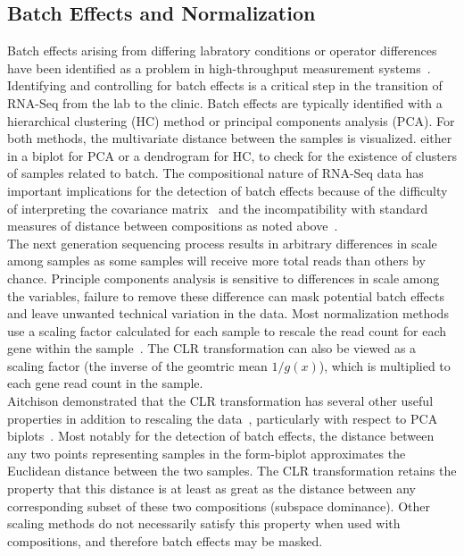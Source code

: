 \documentclass{article}\usepackage[]{graphicx}\usepackage[]{color}
\theoremstyle{definition}
\begin{document}
\subsection{Batch Effects and Normalization}
Batch effects arising from differing labratory conditions or operator differences have been identified as a problem in high-throughput measurement systems~\cite{leek2010, chen2011}.  Identifying and controlling for batch effects is a critical step in the transition of RNA-Seq from the lab to the clinic.  Batch effects are typically identified with a hierarchical clustering (HC) method or principal components analysis (PCA).  For both methods, the multivariate distance between the samples is visualized. either in a biplot for PCA or a dendrogram for HC, to check for the existence of clusters of samples related to batch. %
The compositional nature of RNA-Seq data has important implications for the detection of batch effects because of the difficulty of interpreting the covariance matrix~\cite{Aitchison1986} and the incompatibility with standard measures of distance between compositions as noted above~\cite{Aitchison1986,Martin-Fernandez1998}.\\  %

The next generation sequencing process results in arbitrary differences in scale among samples as some samples will receive more total reads than others by chance. Principle components analysis is sensitive to differences in scale among the variables, failure to remove these difference can mask potential batch effects and leave unwanted technical variation in the data.  Most normalization methods use a scaling factor calculated for each sample to rescale the read count for each gene within the sample~\cite{Dillies2013}.  The CLR transformation can also be viewed as a scaling factor (the inverse of the geomtric mean $1/g(x)$), which is multiplied to each gene read count in the sample.\\

Aitchison demonstrated that the CLR transformation has several other useful properties in addition to rescaling the data~\cite{Aitchison1986}, particularly with respect to PCA biplots~\cite{Aitchison2002}.  Most notably for the detection of batch effects, the distance between any two points representing samples in the form-biplot approximates the Euclidean distance between the two samples.  The CLR transformation retains the property that this distance is at least as great as the distance between any corresponding subset of these two compositions (subspace dominance).  Other scaling methods do not necessarily satisfy this property when used with compositions, and therefore batch effects may be masked.\\
\end{document}
